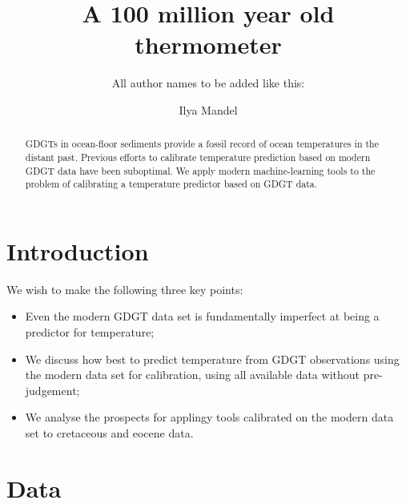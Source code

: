 \documentclass[rmp,aps,twocolumn]{revtex4-1}
\begin{document}
\title{A 100 million year old thermometer}

\author{All author names to be added like this:\\}

\author{Ilya Mandel}

\begin{abstract}

GDGTs in ocean-floor sediments provide a fossil record of ocean temperatures in the distant past.  Previous efforts to calibrate temperature prediction based on modern GDGT data have been suboptimal.  We apply modern machine-learning tools to the problem of calibrating a temperature predictor based on GDGT data.

\end{abstract}

\maketitle

\section{Introduction}


We wish to make the following three key points:

\begin{itemize}

\item Even the modern GDGT data set is fundamentally imperfect at being a predictor for temperature;

\item We discuss how best to predict temperature from GDGT observations using the modern data set for calibration, using all available data without pre-judgement;

\item We analyse the prospects for applingy tools calibrated on the modern data set to cretaceous and eocene data.

\end{itemize}


\section{Data}
\end{document}
